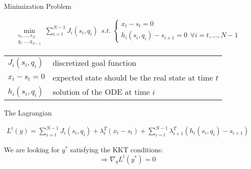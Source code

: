 \begin{frame}{Minimization Problem}
\begin{block}{}
\small{
\begin{align*}
  \min_{\begin{array}{c} s_{t},...,s_{N}\\ q_{t},...,q_{N-1} \end{array}} \sum_{i=t}^{N-1} J_{i}(s_{i},q_{i}) \ \  
  s.t. \ \left\lbrace \begin{array}{c}
  x_{t} - s_{t} = 0 \\
  h_i (s_i ,q_i ) - s_{i+1} = 0 \ \ \forall i = t, ... , N-1 \end{array} \right. 
\end{align*}}
\end{block}
\vspace{1ex}
\begin{tabular}{l l}
  $J_i(s_i, q_i)$ &  discretized goal function 
  \vspace{1ex} \\
$x_t - s_t = 0$ & expected state should be the real state at time $t$
  \vspace{1ex} \\
$h_i (s_i ,q_i )$ & solution of the ODE at time $i$ \\
\end{tabular}
\end{frame}

\begin{frame}{The Lagrangian}
\begin{block}{ }
\begin{align*}
  L^{t}(y) = \sum_{i=t}^{N-1} J_{i}(s_{i},q_{i})
  + \lambda_{t}^{T}(x_{t} - s_{t})
  + \sum_{i=t}^{N-1} \lambda_{i+1}^{T} (h_i (s_i ,q_i ) - s_{i+1}) 
\end{align*}
\vspace{.1ex}
\end{block}
\vspace{1ex}
We are looking for $y^*$ satisfying the KKT conditions: \\

\[ \Rightarrow \nabla_{y} L^{t}(y^*)  = 0 \]

\end{frame}

